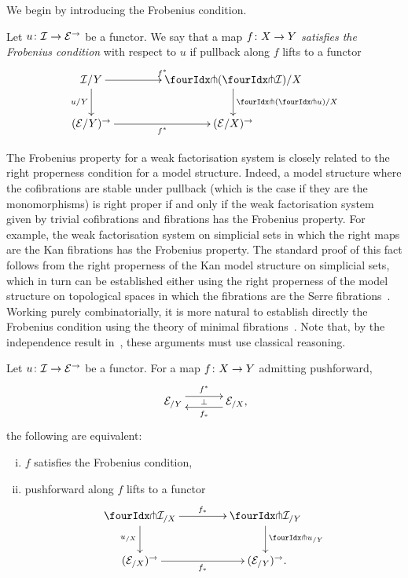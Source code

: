 \documentclass[reqno,10pt,a4paper,oneside,draft]{amsart}
\begin{document}
\medskip

We begin by introducing the Frobenius condition.

\begin{definition}
Let $u \colon \mathcal{I} \to \mathcal{E}^\to$ be a functor.
We say that a map $f \colon X \to Y$ \emph{satisfies the Frobenius condition} with respect to $u$ if pullback along $f$ lifts to a functor
\[
\xymatrix@C=1.5cm{
  \cal{I}/Y
  \ar[r]^{f^*}
  \ar[d]_{u/Y}
&
  \liftl{ ( \liftr{\cal{I}} )}/X  
  \ar[d]^{\liftl{(\liftr{u})/X}}
\\
  (\catE/Y)^\to \ar[r]_{f^*}
&
  (\catE/X)^\to
}
\]
\end{definition}


The Frobenius property for a weak factorisation system is closely related to the right properness condition for a model structure.
Indeed, a model structure where the cofibrations are stable under pullback (which is the case if they are the monomorphisms) is right proper if and only if the weak factorisation system given by trivial cofibrations and fibrations has the Frobenius property.
For example, the weak factorisation system on simplicial sets in which the right maps are the Kan fibrations has the Frobenius property.
The standard proof of this fact follows from the right properness of the Kan model structure on simplicial sets, which in turn can be established either using the right properness of the model structure on topological spaces in which  the fibrations are the Serre fibrations~\cite[Theorem~13.1.13]{hirschhorn-model-localizations}. Working purely combinatorially, it is more natural to
establish directly the Frobenius condition using the theory of minimal fibrations~\cite[Theorem~1.7.1]{joyal-tierney-notes}.
Note that, by the independence result in~\cite{coquand-non-constructivity-kan}, these arguments must use classical reasoning. 


\begin{proposition} \label{lift-dependent-product}
Let $u \colon \mathcal{I} \to \mathcal{E}^\to$ be a functor.
For a map $f \colon X \to Y$ admitting pushforward, 
\[
\xymatrix@C+1em{
  \catE_{/Y}
  \ar@<5pt>[r]^{f^*}
  \ar@{}[r]|{\bot}
&
  \catE_{/X}
  \ar@<5pt>[l]^{f_*} \rlap{,}
}
\]
the following are equivalent:
\begin{enumerate}[(i)]
\item $f$ satisfies the Frobenius condition,
\item pushforward along $f$ lifts to a functor
\[
\xymatrix@C=1.5cm{
  \liftr{\cal{I}}_{/X}
  \ar[r]^{f_*}
  \ar[d]_{u_{/X}}
&
  \liftr{\cal{I}}_{/Y}
  \ar[d]^{\liftr{u}_{/Y}}
\\
  (\catE_{/X})^\to
  \ar[r]_{f_*}
&
  (\catE_{/Y})^\to \rlap{.}
}
\]

\end{enumerate}
\end{proposition}
\end{document}
